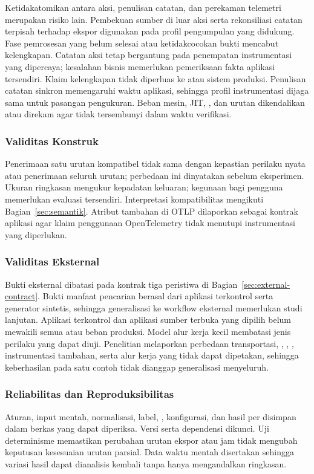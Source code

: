 Ketidakatomikan antara aksi, penulisan catatan, dan perekaman telemetri merupakan risiko lain. Pembekuan sumber di luar aksi serta rekonsiliasi catatan terpisah terhadap ekspor digunakan pada profil pengumpulan yang didukung. Fase pemrosesan yang belum selesai atau ketidakcocokan bukti mencabut kelengkapan. Catatan aksi tetap bergantung pada penempatan instrumentasi yang dipercaya;  kesalahan bisnis memerlukan pemeriksaan fakta aplikasi tersendiri. Klaim kelengkapan tidak diperluas ke  atau sistem produksi. Penulisan catatan sinkron memengaruhi waktu aplikasi, sehingga profil instrumentasi dijaga sama untuk pasangan pengukuran. Beban mesin, JIT, , dan urutan  dikendalikan atau direkam agar tidak tersembunyi dalam waktu verifikasi.

\subsubsection{Validitas Konstruk}
Penerimaan satu urutan kompatibel tidak sama dengan kepastian perilaku nyata atau penerimaan seluruh urutan; perbedaan ini dinyatakan sebelum eksperimen. Ukuran ringkasan mengukur kepadatan keluaran; kegunaan bagi pengguna memerlukan evaluasi tersendiri. Interpretasi kompatibilitas mengikuti Bagian~\ref{sec:semantik}. Atribut tambahan di OTLP dilaporkan sebagai kontrak aplikasi agar klaim penggunaan OpenTelemetry tidak menutupi instrumentasi yang diperlukan.

\subsubsection{Validitas Eksternal}
Bukti eksternal dibatasi pada kontrak tiga peristiwa di Bagian~\ref{sec:external-contract}. Bukti manfaat pencarian berasal dari aplikasi terkontrol serta generator sintetis, sehingga generalisasi ke workflow eksternal memerlukan studi lanjutan. Aplikasi terkontrol dan aplikasi sumber terbuka yang dipilih belum mewakili semua  atau beban produksi. Model alur kerja kecil membatasi jenis perilaku yang dapat diuji. Penelitian melaporkan perbedaan transportasi, , , , instrumentasi tambahan, serta alur kerja yang tidak dapat dipetakan, sehingga keberhasilan pada satu contoh tidak dianggap generalisasi menyeluruh.

\subsubsection{Reliabilitas dan Reproduksibilitas}
Aturan, input mentah, normalisasi, label, , konfigurasi, dan hasil per  disimpan dalam berkas yang dapat diperiksa. Versi  serta dependensi dikunci. Uji determinisme memastikan perubahan urutan ekspor atau jam tidak mengubah keputusan kesesuaian urutan parsial. Data waktu mentah disertakan sehingga variasi hasil dapat dianalisis kembali tanpa hanya mengandalkan ringkasan.
